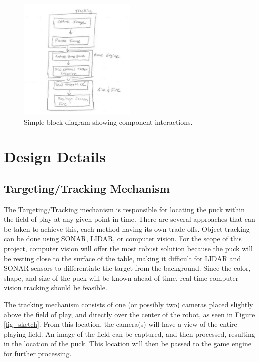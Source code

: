 \documentclass[letterpaper,10pt,onecolumn,titlepage]{article}
\begin{document}
\begin{figure}[h!]
  \centering
  \includegraphics[width=0.5\textwidth]{./block_diag.eps}
  \caption{Simple block diagram showing component interactions.}
  \label{block_diag}
\end{figure}



\section{Design Details}
\subsection{Targeting/Tracking Mechanism}
The Targeting/Tracking mechanism is responsible for locating the puck within
the field of play at any given point in time.  There are several approaches
that can be taken to achieve this, each method having its own trade-offs.
Object tracking can be done using SONAR, LIDAR, or computer vision.  For the
scope of this project, computer vision will offer the most robust solution
because the puck will be resting close to the surface of the table, making it
difficult for LIDAR and SONAR sensors to differentiate the target from the
background.  Since the color, shape, and size of the puck will be known 
ahead of time, real-time computer vision tracking should be feasible.

The tracking mechanism consists of one (or possibly two) cameras placed
slightly above the field of play, and directly over the center of the robot,
as seen in Figure \ref{fig_sketch}.
From this location, the camera(s) will have a view of the entire playing field.
An image of the field can be captured, and then processed, resulting in the
location of the puck.  This location will then be passed to the game engine
for further processing.
\end{document}
